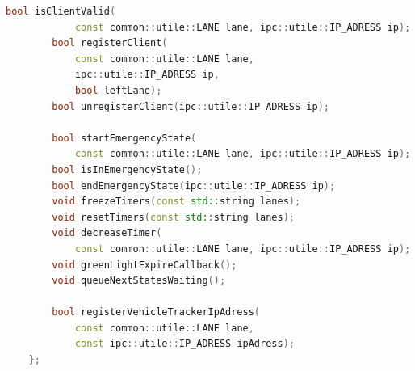 \documentclass[17pt]{article}
\begin{document}
\begin{lstlisting}[language = C++]
        bool isClientValid(
            const common::utile::LANE lane, ipc::utile::IP_ADRESS ip);
        bool registerClient(
            const common::utile::LANE lane,
            ipc::utile::IP_ADRESS ip,
            bool leftLane);
        bool unregisterClient(ipc::utile::IP_ADRESS ip);

        bool startEmergencyState(
            const common::utile::LANE lane, ipc::utile::IP_ADRESS ip);
        bool isInEmergencyState();
        bool endEmergencyState(ipc::utile::IP_ADRESS ip);
        void freezeTimers(const std::string lanes);
        void resetTimers(const std::string lanes);
        void decreaseTimer(
            const common::utile::LANE lane, ipc::utile::IP_ADRESS ip);
        void greenLightExpireCallback();
        void queueNextStatesWaiting();

        bool registerVehicleTrackerIpAdress(
            const common::utile::LANE lane,
            const ipc::utile::IP_ADRESS ipAdress);
    };
\end{lstlisting}

\pagebreak
\printbibliography
\end{document}
